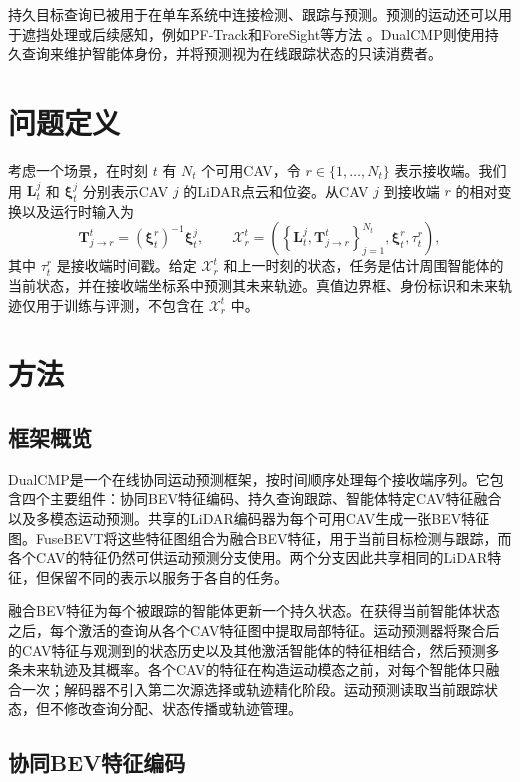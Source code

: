 \documentclass[lettersize,journal]{IEEEtran}
\begin{document}
持久目标查询已被用于在单车系统中连接检测、跟踪与预测。预测的运动还可以用于遮挡处理或后续感知，例如PF-Track和ForeSight等方法 \cite{pang2023pftrack,papais2025foresight}。DualCMP则使用持久查询来维护智能体身份，并将预测视为在线跟踪状态的只读消费者。

\section{问题定义}

考虑一个场景，在时刻 \(t\) 有 \(N_t\) 个可用CAV，令 \(r\in\{1,\ldots,N_t\}\) 表示接收端。我们用 \(\mathbf{L}_t^j\) 和 \(\boldsymbol{\xi}_t^j\) 分别表示CAV \(j\) 的LiDAR点云和位姿。从CAV \(j\) 到接收端 \(r\) 的相对变换以及运行时输入为
\[
\mathbf{T}_{j\rightarrow r}^t
=\left(\boldsymbol{\xi}_t^r\right)^{-1}\boldsymbol{\xi}_t^j,
\qquad
\mathcal{X}_r^t=
\left(
\left\{\mathbf{L}_t^j,\mathbf{T}_{j\rightarrow r}^t\right\}_{j=1}^{N_t},
\boldsymbol{\xi}_t^r,\tau_t^r
\right),
\tag{1}
\]
其中 \(\tau_t^r\) 是接收端时间戳。给定 \(\mathcal{X}_r^t\) 和上一时刻的状态，任务是估计周围智能体的当前状态，并在接收端坐标系中预测其未来轨迹。真值边界框、身份标识和未来轨迹仅用于训练与评测，不包含在 \(\mathcal{X}_r^t\) 中。

\section{方法}
\subsection{框架概览}

DualCMP是一个在线协同运动预测框架，按时间顺序处理每个接收端序列。它包含四个主要组件：协同BEV特征编码、持久查询跟踪、智能体特定CAV特征融合以及多模态运动预测。共享的LiDAR编码器为每个可用CAV生成一张BEV特征图。FuseBEVT将这些特征图组合为融合BEV特征，用于当前目标检测与跟踪，而各个CAV的特征仍然可供运动预测分支使用。两个分支因此共享相同的LiDAR特征，但保留不同的表示以服务于各自的任务。

融合BEV特征为每个被跟踪的智能体更新一个持久状态。在获得当前智能体状态之后，每个激活的查询从各个CAV特征图中提取局部特征。运动预测器将聚合后的CAV特征与观测到的状态历史以及其他激活智能体的特征相结合，然后预测多条未来轨迹及其概率。各个CAV的特征在构造运动模态之前，对每个智能体只融合一次；解码器不引入第二次源选择或轨迹精化阶段。运动预测读取当前跟踪状态，但不修改查询分配、状态传播或轨迹管理。

\subsection{协同BEV特征编码}
\end{document}
